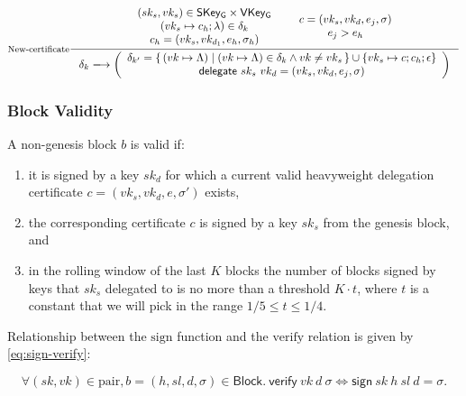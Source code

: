 \documentclass[11pt,a4paper]{article}
\newcommand\Set[2]{\{\,#1\mid#2\,\}}
\newcommand{\var}[1]{\mathit{#1}}
\newcommand{\fun}[1]{\mathsf{#1}}
\newcommand{\type}[1]{\mathsf{#1}}
\newcommand{\trans}[2]{\xlongrightarrow[\textsc{#1}]{#2}}
\newcommand{\Block}{\type{Block}}
\newcommand{\SKeyGen}{\type{SKey_G}}
\newcommand{\VKeyGen}{\type{VKey_G}}
\newcommand{\signname}{sign}
\newcommand{\verifyname}{verify}
\newcommand{\delegatename}{delegate}
\newcommand{\keypairname}{pair}
\newcommand{\sign}[4]{\fun{\signname}\ #1 ~ #2 ~ #3 ~ #4}
\newcommand{\verify}[3]{\fun{\verifyname} ~ #1 ~ #2 ~ #3}
\newcommand{\delegate}[2]{\fun{\delegatename}\ #1 ~ #2}
\newcommand{\delmap}{\delta}
\newcommand{\partialf}{\mapsto}
\begin{document}
\begin{equation}
  \label{eq:new-del-cert}
  \inference[New-certificate]
  {
    {
      \begin{array}{c}
        (sk_s, vk_s) \in \SKeyGen \times \VKeyGen \\
        (vk_s \partialf c_h; \lambda) \in \delmap_k \\
        c_h = (vk_s, vk_{d_1}, e_h, \sigma_h)
      \end{array}
    }
    &
    {
      \begin{array}{c}
        c = (vk_s, vk_d, e_j, \sigma) \\
        e_j > e_h
      \end{array}
    }
  }
  {\delmap_k \trans{}{}
    \left(
    {
      \begin{array}{c}
        \delmap_{k'} = \Set{(vk \partialf \Lambda)}{(vk \partialf \Lambda) \in \delmap_k \wedge vk \neq vk_s} \cup \{vk_s \partialf c; c_h; \epsilon\} \\
        \delegate{sk_s}{vk_d} = (vk_s, vk_d, e_j, \sigma)
      \end{array}
    }
    \right)
  }
\end{equation}

\subsubsection{Block Validity}
\label{sec:block-valid}

A non-genesis block $\var{b}$ is valid if:
%
\begin{enumerate}
\item it is signed by a key $\var{sk_d}$ for which a current valid heavyweight delegation
  certificate $c = (vk_s, vk_d, e, \sigma')$ exists,
\item the corresponding certificate $c$ is signed by a key $sk_s$ from the
  genesis block, and
\item in the rolling window of the last $K$ blocks the number of blocks signed
  by keys that $sk_s$ delegated to is no more than a threshold $K \cdot t$,
  where $t$ is a constant that we will pick in the range
  $1/5 \leq t \leq 1/4$.
\end{enumerate}


Relationship between the $\text{\signname}$ function and the
$\text{\verifyname}$ relation is given by \eqref{eq:sign-verify}:

\begin{equation}
  \label{eq:sign-verify}
  \forall (sk, vk) \in \text{\keypairname}, b = (h, sl, d, \sigma) \in \Block.\
  \verify{vk}{d}{\sigma} \iff \sign{sk}{h}{sl}{d} = \sigma.
\end{equation}
\end{document}
